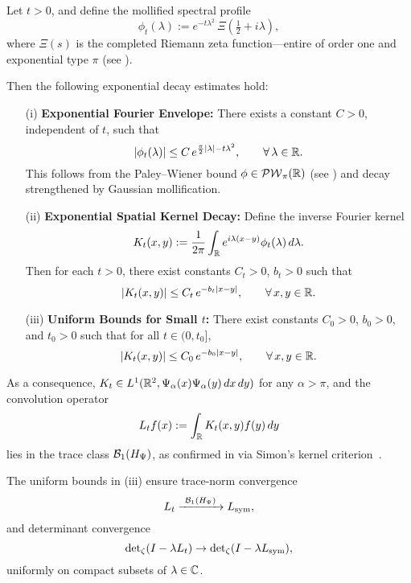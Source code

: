 \begin{lemma}
\label{lem:decay_mollified_kernel}
Let \( t > 0 \), and define the mollified spectral profile
\[
\phi_t(\lambda) := e^{-t\lambda^2} \, \Xi\left(\tfrac{1}{2} + i\lambda\right),
\]
where \( \Xi(s) \) is the completed Riemann zeta function—entire of order one and exponential type \( \pi \) (see ).

Then the following exponential decay estimates hold:
\begin{enumerate}
    \item[\textup{(i)}] \textbf{Exponential Fourier Envelope:} There exists a constant \( C > 0 \), independent of \( t \), such that
    \[
    |\phi_t(\lambda)| \le C \, e^{\frac{\pi}{2}|\lambda| - t\lambda^2}, \qquad \forall\, \lambda \in \mathbb{R}.
    \]
    This follows from the Paley--Wiener bound \( \phi \in \mathcal{PW}_{\pi}(\mathbb{R}) \) (see ) and decay strengthened by Gaussian mollification.

    \item[\textup{(ii)}] \textbf{Exponential Spatial Kernel Decay:} Define the inverse Fourier kernel
    \[
    K_t(x,y) := \frac{1}{2\pi} \int_{\mathbb{R}} e^{i\lambda(x - y)} \phi_t(\lambda)\,d\lambda.
    \]
    Then for each \( t > 0 \), there exist constants \( C_t > 0 \), \( b_t > 0 \) such that
    \[
    |K_t(x,y)| \le C_t\, e^{-b_t |x - y|}, \qquad \forall\, x, y \in \mathbb{R}.
    \]

    \item[\textup{(iii)}] \textbf{Uniform Bounds for Small \( t \):} There exist constants \( C_0 > 0 \), \( b_0 > 0 \), and \( t_0 > 0 \) such that for all \( t \in (0, t_0] \),
    \[
    |K_t(x,y)| \le C_0\, e^{-b_0 |x - y|}, \qquad \forall\, x, y \in \mathbb{R}.
    \]
\end{enumerate}

\noindent
As a consequence, \( K_t \in L^1(\mathbb{R}^2, \Psi_\alpha(x)\Psi_\alpha(y)\, dx\,dy) \) for any \( \alpha > \pi \), and the convolution operator
\[
L_t f(x) := \int_{\mathbb{R}} K_t(x,y) f(y)\, dy
\]
lies in the trace class \( \mathcal{B}_1(H_{\Psi}) \), as confirmed in  via Simon’s kernel criterion~\cite[Thm.~4.2]{Simon2005TraceIdeals}.

\medskip
\noindent
The uniform bounds in \textup{(iii)} ensure trace-norm convergence
\[
L_t \xrightarrow{\ \TC(\HPsi)\ } \Lsym,
\]
and determinant convergence
\[
\det\nolimits_{\zeta}(I - \lambda L_t) \to \det\nolimits_{\zeta}(I - \lambda L_{\mathrm{sym}}),
\]
uniformly on compact subsets of \( \lambda \in \mathbb{C} \).
\end{lemma}
